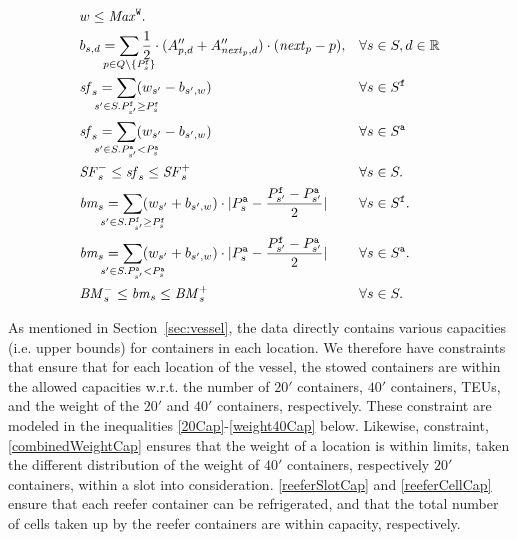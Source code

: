 \begin{align}
	\label{wTotalLim}
	&w \leq \mi{Max}^\trt{W}. 
			&&\\
	\label{defBancy}
	&b_{s,d} = \smashoperator[lr]{\sum_{p \in Q\setminus \{P^\trt{f}_s\}}} \frac{1}{2}\cdot(A''_{p,d}+A''_{\mi{next}_p,d})\cdot (\mi{next}_p-p), 
			&& \forall s\in S, d\in \mathbb{R}\\%
	\label{sfF}
	&\mi{sf}_s = \smashoperator[lr]{\sum_{s' \in S. P^\texttt{f}_{s'} \geq P^\texttt{f}_s}} (w_{s'} - b_{s',w}) 
			&& \forall s \in S^\texttt{f}\\
	\label{sfA}
	&\mi{sf}_s = \smashoperator[lr]{\sum_{s' \in S. P^\texttt{a}_{s'} < P^\texttt{a}_s}} (w_{s'} - b_{s',w}) 
			&& \forall s \in S^\texttt{a}\\
	\label{sfLim}
	&\mi{SF}^-_s \leq \mi{sf}_s \leq \mi{SF}^+_s
			&& \forall s \in S.\\
	\label{bmF}
	&\mi{bm}_s = 	\smashoperator[lr]{\sum_{s' \in S. P^\texttt{f}_{s'} \geq P^\texttt{f}_s}} (w_{s'} + b_{s',w})\cdot |P^\trt{a}_s - \frac{P^\trt{f}_{s'}-P^\trt{a}_{s'}}{2}|
			&& \forall s \in S^\texttt{f}.\\
	\label{bmA}
	&\mi{bm}_s = \smashoperator[lr]{\sum_{s' \in S. P^\texttt{a}_{s'} < P^\texttt{a}_s}} (w_{s'} + b_{s',w})\cdot |P^\trt{a}_s - \frac{P^\trt{f}_{s'}-P^\trt{a}_{s'}}{2}|
			&& \forall s \in S^\texttt{a}.\\
	\label{bmLim}
	&\mi{BM}^-_s \leq \mi{bm}_s \leq \mi{BM}^+_s 
			&& \forall s \in S. 
\end{align}

As mentioned in Section~\ref{sec:vessel}, the data directly contains various capacities (i.e. upper bounds) for containers in each location. We therefore have constraints that ensure that for each location of the vessel, the stowed containers are within the allowed capacities w.r.t. the number of $20'$ containers, $40'$ containers, TEUs, and the weight of the $20'$ and $40'$ containers, respectively. These constraint are modeled in the inequalities \eqref{20Cap}-\eqref{weight40Cap} below.
Likewise, constraint, \eqref{combinedWeightCap} ensures that the weight of a location is within limits, taken the different distribution of the weight of $40'$ containers, respectively $20'$ containers, within a slot into consideration. 
\eqref{reeferSlotCap} and \eqref{reeferCellCap} ensure that each reefer container can be refrigerated, and that {the total number of cells taken up by the reefer containers are within capacity}, respectively. 

